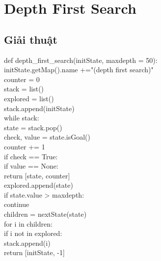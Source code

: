 \documentclass[a4paper]{article}
\begin{document}
\tableofcontents
\newpage
\section {Depth First Search}
\subsection{Giải thuật}
\begin{flushleft}
\hspace{2 cm}	def depth\_first\_search(initState, maxdepth = 50):\\
\hspace{3 cm}	initState.getMap().name +="(depth first search)"\\
\hspace{3 cm}	counter = 0\\
\hspace{3 cm}	stack = list()\\
\hspace{3 cm}	explored = list()\\
\hspace{3 cm}	stack.append(initState)\\
\hspace{3 cm}	while stack:\\
\hspace{4 cm}	state = stack.pop()\\
\hspace{4 cm}	check, value = state.isGoal()\\
\hspace{4 cm}	counter += 1\\
\hspace{4 cm}	if check == True:\\
\hspace{5 cm}	if value == None:\\
\hspace{6 cm}	return [state, counter]\\
\hspace{4 cm}	explored.append(state)\\
\hspace{4 cm}	if state.value > maxdepth:\\
\hspace{5 cm}	continue\\
\hspace{4 cm}	children = nextState(state)\\
\hspace{4 cm}	for i in children:\\
\hspace{5 cm}	if i not in explored:\\
\hspace{6 cm}	stack.append(i)\\
\hspace{3 cm}	return [initState, -1]\\
\end{flushleft}
\newpage
\end{document}
